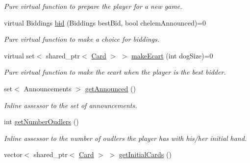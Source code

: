 \begin{DoxyCompactItemize}
\begin{DoxyCompactList}\small\item\em \-Pure virtual function to prepare the player for a new game. \end{DoxyCompactList}\item 
virtual \-Biddings \hyperlink{classPlayer_add75318310fa04cd492a1cf32c8e9a00}{bid} (\-Biddings best\-Bid, bool chelem\-Announced)=0
\begin{DoxyCompactList}\small\item\em \-Pure virtual function to make a choice for biddings. \end{DoxyCompactList}\item 
virtual set$<$ shared\-\_\-ptr$<$ \hyperlink{classCard}{\-Card} $>$ $>$ \hyperlink{classPlayer_af4ec3b84a1f57691f867121f64be3d22}{make\-Ecart} (int dog\-Size)=0
\begin{DoxyCompactList}\small\item\em \-Pure virtual function to make the ecart when the player is the best bidder. \end{DoxyCompactList}\item 
\hypertarget{classPlayer_aa1c5b7d16fb6fd0427b404e89850a84b}{set$<$ \-Announcements $>$ \hyperlink{classPlayer_aa1c5b7d16fb6fd0427b404e89850a84b}{get\-Announced} ()}\label{classPlayer_aa1c5b7d16fb6fd0427b404e89850a84b}

\begin{DoxyCompactList}\small\item\em \-Inline assessor to the set of announcements. \end{DoxyCompactList}\item 
\hypertarget{classPlayer_af242539c463b23a5712e2343af483d99}{int \hyperlink{classPlayer_af242539c463b23a5712e2343af483d99}{get\-Number\-Oudlers} ()}\label{classPlayer_af242539c463b23a5712e2343af483d99}

\begin{DoxyCompactList}\small\item\em \-Inline assessor to the number of oudlers the player has with his/her initial hand. \end{DoxyCompactList}\item 
\hypertarget{classPlayer_a18e512170f8327237dbfced03155015c}{vector$<$ shared\-\_\-ptr$<$ \hyperlink{classCard}{\-Card} $>$ $>$ \hyperlink{classPlayer_a18e512170f8327237dbfced03155015c}{get\-Initial\-Cards} ()}\label{classPlayer_a18e512170f8327237dbfced03155015c}


\end{DoxyCompactItemize}
